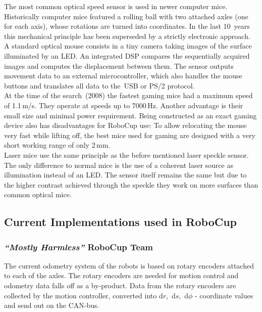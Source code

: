 \documentclass[12pt,a4paper]{article}
\newcommand{\MH}{\emph{``Mostly Harmless''} RoboCup Team\xspace}
\begin{document}
The most common optical speed sensor is used in newer computer mice.
Historically computer mice featured a rolling ball with two attached axles (one for each axis), whose rotations are turned into coordinates.
In the last 10~years this mechanical principle has been superseded by a strictly electronic approach.\\
A standard optical mouse consists in a tiny camera taking images of the surface illuminated by an LED.
An integrated DSP compares the sequentially acquired images and computes the displacement between them.
The sensor outputs movement data to an external microcontroller, which also handles the mouse buttons and translates all data to the~USB or PS/2 protocol.\\
At the time of the search~(2008) the fastest gaming mice had a maximum speed of 1.1\,m/s.
They operate at speeds up to 7000\,Hz.
Another advantage is their small size and minimal power requirement.
Being constructed as an exact gaming device also has disadvantages for RoboCup use:
To allow relocating the mouse very fast while lifting off, the best mice used for gaming are designed with a very short working range of only 2\,mm.\\
Laser mice use the same principle as the before mentioned laser speckle sensor.
The only difference to normal mice is the use of a coherent laser source as illumination instead of an LED.
The sensor itself remains the same but due to the higher contrast achieved through the speckle they work on more surfaces than common optical mice.


\subsection{Current Implementations used in RoboCup}

\subsubsection{\MH}

The current odometry system of the robots is based on rotary encoders attached to each of the axles. 
The rotary encoders are needed for motion control and odometry data falls off as a by-product.
Data from the rotary encoders are collected by the motion controller, converted into d$r$,~d$s$,~d$\phi$ - coordinate values and send out on the CAN-bus.
\end{document}

